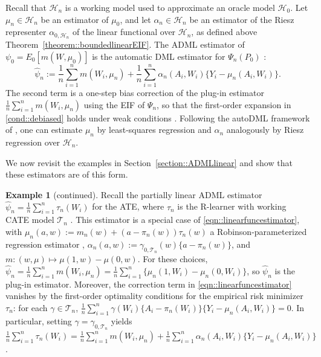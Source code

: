 \documentclass[11pt]{article}
\theoremstyle{definition}
\newtheorem{example}{Example}
\begin{document}
Recall that \(\mathcal{H}_n\) is a working model used to approximate an oracle model \(\mathcal{H}_0\). Let \(\mu_n \in \mathcal{H}_n\) be an estimator of \(\mu_0\), and let \(\alpha_n \in \mathcal{H}_n\) be an estimator of the Riesz representer \(\alpha_{0,\mathcal{H}_n}\) of the linear functional over \(\mathcal{H}_n\), as defined above Theorem~\ref{theorem::boundedlinearEIF}. The ADML estimator of \(\psi_0 = E_0[m(W,\mu_0)]\) is the automatic DML estimator for \(\Psi_n(P_0)\) \citep{chernozhukov2022automatic}:
\begin{equation}
    \widehat{\psi}_n := \frac{1}{n}\sum_{i=1}^n m(W_i, \mu_n) + \frac{1}{n}\sum_{i=1}^n \alpha_n(A_i, W_i)\{Y_i - \mu_n(A_i, W_i)\}. \label{eqn::linearfuncestimator}
\end{equation}
The second term is a one-step bias correction of the plug-in estimator \(\frac{1}{n} \sum_{i=1}^n m(W_i, \mu_n)\) using the EIF of \(\Psi_n\), so that the first-order expansion in \ref{cond::debiased} holds under weak conditions \citep{bickel1993efficient}. Following the autoDML framework of \cite{chernozhukov2022automatic}, one can estimate \(\mu_n\) by least-squares regression and \(\alpha_n\) analogously by Riesz regression over \(\mathcal{H}_n\).



We now revisit the examples in Section~\ref{section::ADMLlinear} and show that these estimators are of this form.


\setcounter{example}{1}
\begin{example}[continued]
Recall the partially linear ADML estimator \(\widehat{\psi}_n = \frac{1}{n} \sum_{i=1}^n \tau_n(W_i)\) for the ATE, where \(\tau_n\) is the R-learner with working CATE model \(\mathcal{T}_n\) \citep{nie2021quasi}. This estimator is a special case of \eqref{eqn::linearfuncestimator}, with \(\mu_n(a,w) := m_n(w) + (a-\pi_n(w))\tau_n(w)\) a Robinson-parameterized regression estimator \citep{robinson1988root}, \(\alpha_n(a,w) := \gamma_{0,\mathcal{T}_n}(w)\{a-\pi_n(w)\}\), and \(m:(w,\mu) \mapsto \mu(1,w)-\mu(0,w)\). For these choices, \(\widehat{\psi}_n = \frac{1}{n} \sum_{i=1}^n m(W_i,\mu_n) = \frac{1}{n} \sum_{i=1}^n \{\mu_n(1,W_i)-\mu_n(0,W_i)\}\), so \(\widehat{\psi}_n\) is the plug-in estimator. Moreover, the correction term in \eqref{eqn::linearfuncestimator} vanishes by the first-order optimality conditions for the empirical risk minimizer \(\tau_n\): for each \(\gamma \in \mathcal{T}_n\), \(\frac{1}{n} \sum_{i=1}^n \gamma(W_i)\{A_i-\pi_n(W_i)\}\{Y_i-\mu_n(A_i,W_i)\}=0\). In particular, setting \(\gamma=\gamma_{0,\mathcal{T}_n}\) yields \(\frac{1}{n} \sum_{i=1}^n \tau_n(W_i) = \frac{1}{n} \sum_{i=1}^n m(W_i,\mu_n) + \frac{1}{n} \sum_{i=1}^n \alpha_n(A_i,W_i)\{Y_i-\mu_n(A_i,W_i)\}\).
\end{example} 
\end{document}
